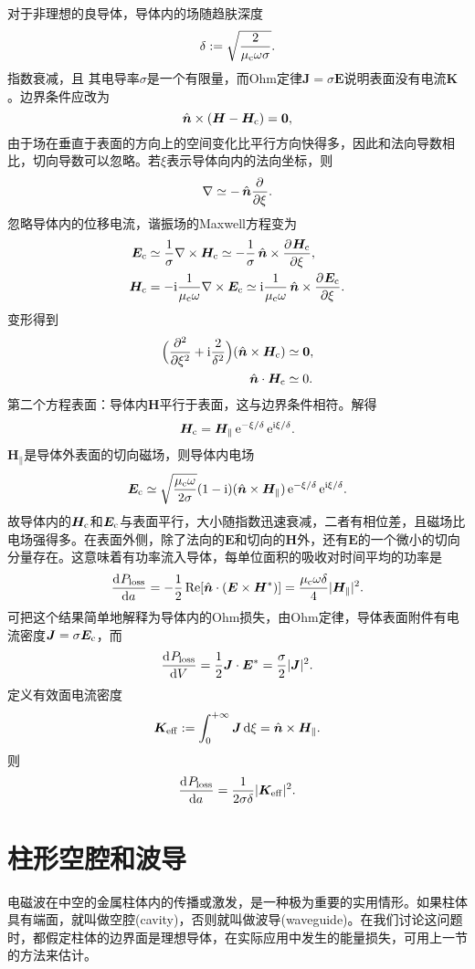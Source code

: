 对于非理想的良导体，导体内的场随趋肤深度
\begin{equation}
    \delta:=\sqrt{\frac2{\mu\c\omega\sigma}}.
\end{equation}
指数衰减，且
其电导率$\sigma$是一个有限量，而Ohm定律$\bm J=\sigma\bm E$说明表面没有电流$\bm K$。边界条件应改为
\[
    \uvec n\times(\bm H-\bm H\c)=\bm 0,
\]
由于场在垂直于表面的方向上的空间变化比平行方向快得多，因此和法向导数相比，切向导数可以忽略。若$\xi$表示导体向内的法向坐标，则
\[
    \nabla\simeq-\uvec n\pp\xi.
\]
忽略导体内的位移电流，谐振场的Maxwell方程变为
\begin{align*}
    \bm E\c&\simeq\frac1\sigma\curl\bm H\c\simeq-\frac1\sigma\uvec n\times\pv{\bm H\c}\xi,\\
    \bm H\c&=-\i\frac1{\mu\c\omega}\curl\bm E\c\simeq\i\frac1{\mu\c\omega}\uvec n\times\pv{\bm E\c}\xi.
\end{align*}
变形得到
\begin{align*}
    \Bigkh{\pp[2]\xi+\i\frac2{\delta^2}}(\uvec n\times\bm H\c)&\simeq\bm 0,\\
    \uvec n\cdot\bm H\c&\simeq 0.
\end{align*}
第二个方程表面：导体内$\bm H$平行于表面，这与边界条件相符。解得
\begin{equation}
    \bm H\c=\bm H_\parallel\e{-\xi/\delta}\e{\i\xi/\delta}.
\end{equation}
$\bm H_\parallel$是导体外表面的切向磁场，则导体内电场
\begin{equation}
    \bm E\c\simeq\sqrt{\frac{\mu\c\omega}{2\sigma}}(1-\i)(\uvec n\times\bm H_\parallel)\e{-\xi/\delta}\e{\i\xi/\delta}.
\end{equation}
故导体内的$\bm H\c$和$\bm E\c$与表面平行，大小随指数迅速衰减，二者有相位差，且磁场比电场强得多。在表面外侧，除了法向的$\bm E$和切向的$\bm H$外，还有$\bm E$的一个微小的切向分量存在。这意味着有功率流入导体，每单位面积的吸收对时间平均的功率是
\begin{equation}
    \dv{P_\text{loss}}a=-\frac12\Re[\uvec n\cdot(\bm E\times\bm H\cj)]=\frac{\mu\c\omega\delta}4|\bm H_\parallel|^2.
\end{equation}
可把这个结果简单地解释为导体内的Ohm损失，由Ohm定律，导体表面附件有电流密度$\bm J=\sigma\bm E\c$，而
\[
    \dv{P_\text{loss}}V=\frac12\bm J\cdot\bm E\cj=\frac\sigma 2|\bm J|^2.
\]
定义有效面电流密度
\[
    \bm K\eff:=\int\zti\bm J\d\xi=\uvec n\times\bm H_\parallel.
\]
则
\[
    \dv{P_\text{loss}}a=\frac1{2\sigma\delta}|\bm K\eff|^2.
\]
\section{柱形空腔和波导}
电磁波在中空的金属柱体内的传播或激发，是一种极为重要的实用情形。如果柱体具有端面，就叫做空腔(cavity)，否则就叫做波导(waveguide)。在我们讨论这问题时，都假定柱体的边界面是理想导体，在实际应用中发生的能量损失，可用上一节的方法来估计。


